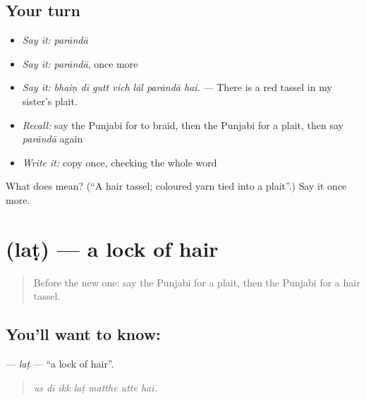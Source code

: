 \subsection*{Your turn}
\begin{itemize}
\raggedright
  \item \emph{Say it:} \emph{parāndā}
  \item \emph{Say it:} \emph{parāndā}, once more
  \item \emph{Say it:} \emph{bhaiṇ dī gutt vich lāl parāndā hai.} — There is a red tassel in my sister's plait.
  \item \emph{Recall:} say the Punjabi for to braid, then the Punjabi for a plait, then say \emph{parāndā} again
  \item \emph{Write it:} copy \textbf{} once, checking the whole word
\end{itemize}

\begin{tcolorbox}[breakable,colback=teal!4,colframe=teal!35!black,title={Before you move on}]
What does  mean? (\textquotedblleft{}A hair tassel; coloured yarn tied into a plait\textquotedblright{}.) Say it once more.
\end{tcolorbox}
\section[\texorpdfstring{\pa{ਲਟ} (laṭ)}{ਲਟ (laṭ)}]{ (laṭ) — a lock of hair}

\label{lesson:PA-C231-lat}



\begin{quote}
Before the new one: say the Punjabi for a plait, then the Punjabi for a hair tassel.
\end{quote}

\subsection*{You'll want to know: }
\textbf{} — \emph{laṭ} — \textquotedblleft{}a lock of hair\textquotedblright{}.

\begin{quote}
      
\end{quote}

\begin{quote}
\emph{us dī ikk laṭ matthe utte hai.}
\end{quote}

